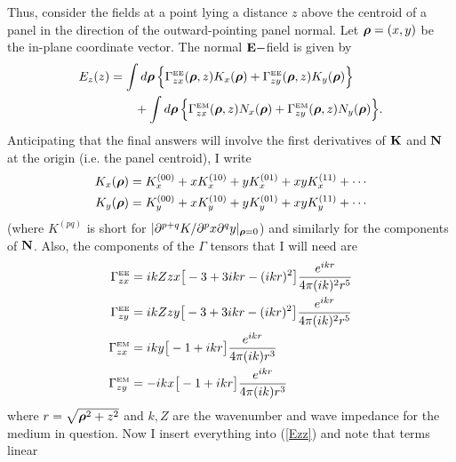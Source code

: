 \documentclass[letterpaper]{article}
\begin{document}
Thus, consider the fields at a point lying a distance $z$
above the centroid of a panel in the direction of the 
outward-pointing panel normal. Let $\boldsymbol{\rho}=(x,y)$ be the
in-plane coordinate vector. The normal $\mathbf{E}-$field is given by
\begin{align}
E_z(z) 
 &= \int d\boldsymbol{\rho} \, \Big\{ 
             \Gamma_{zx}^{\hbox{\tiny{EE}}}(\boldsymbol{\rho}, z) K_x(\boldsymbol{\rho}) 
            +\Gamma_{zy}^{\hbox{\tiny{EE}}}(\boldsymbol{\rho}, z) K_y(\boldsymbol{\rho}) 
           \Big\}
\nonumber \\
&\qquad
   + \int d\boldsymbol{\rho} \, \Big\{ 
             \Gamma_{zx}^{\hbox{\tiny{EM}}}(\boldsymbol{\rho}, z) N_x(\boldsymbol{\rho}) 
            +\Gamma_{zy}^{\hbox{\tiny{EM}}}(\boldsymbol{\rho}, z) N_y(\boldsymbol{\rho}) 
           \Big\}.
\label{Ezz}
\end{align}
Anticipating that the final answers will involve the 
first derivatives of $\mathbf{K}$ and $\mathbf{N}$ at the origin (i.e. the panel 
centroid), I write
\begin{align*}
 K_x(\boldsymbol{\rho}) &= K_x^{(00)} + x K_x^{(10)} + y K_x^{(01)} + xyK_x^{(11)}
  + \cdots 
\\
 K_y(\boldsymbol{\rho}) &= K_y^{(00)} + x K_y^{(10)} + y K_y^{(01)} + xyK_y^{(11)}
  + \cdots
\end{align*}
(where $K^{(pq)}$ is short 
for $|\partial^{p+q} K/\partial^p x \partial^q y|_{\boldsymbol{\rho}=0}$)
and similarly for the components of $\mathbf{N}$.
Also, the components of the $\Gamma$ tensors that I will need are
\begin{align*}
 \Gamma^{\hbox{\tiny{EE}}}_{zx} &= i k Z zx \big[-3 + 3ikr - (ikr)^2\big]
  \frac{e^{ikr}}{4\pi (ik)^2 r^5}
\\
 \Gamma^{\hbox{\tiny{EE}}}_{zy} &= i k Z zy \big[-3 + 3ikr - (ikr)^2\big]
  \frac{e^{ikr}}{4\pi (ik)^2 r^5}
\\
 \Gamma^{\hbox{\tiny{EM}}}_{zx} &= i k y \big[-1 + ikr\big]
  \frac{e^{ikr}}{4\pi (ik) r^3}
\\
 \Gamma^{\hbox{\tiny{EM}}}_{zy} &= -i k x \big[-1 +ikr\big]
  \frac{e^{ikr}}{4\pi (ik) r^3}
\end{align*}
where $r=\sqrt{\boldsymbol{\rho}^2 + z^2}$ and $k,Z$ are the wavenumber and
wave impedance for the medium in question.
Now I insert everything into (\ref{Ezz}) and note that terms linear
\end{document}
